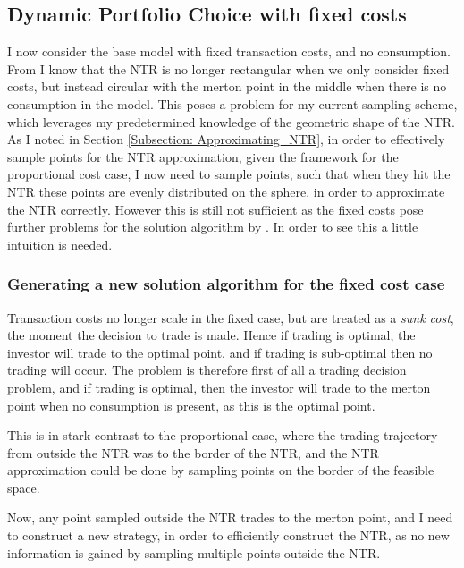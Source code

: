 \documentclass[11pt]{article}
\begin{document}
\subsection{Dynamic Portfolio Choice with fixed costs} \label{Subsection: Results_FixedCosts_No_Correlation}
I now consider the base model with fixed transaction costs, and no consumption.
From \autocite{Dybvig2020} I know that the \ac{NTR} is no longer rectangular when we only consider fixed costs, but instead circular
with the merton point in the middle when there is no consumption in the model.
This poses a problem for my current sampling scheme, which leverages my predetermined knowledge of the geometric shape of the \ac{NTR}.
As I noted in Section \ref{Subsection: Approximating_NTR}, in order to effectively sample points for the \ac{NTR} approximation, given the framework for the proportional cost case,
I now need to sample points, such that when they hit the \ac{NTR} these points are evenly distributed on the sphere, in order to approximate the \ac{NTR} correctly.
However this is still not sufficient as the fixed costs pose further problems for the solution algorithm by \autocite{Scheidegger2023}.
In order to see this a little intuition is needed.

\subsubsection{Generating a new solution algorithm for the fixed cost case} \label{Subsubsection: FixedCostSolution}
Transaction costs no longer scale in the fixed case, but are treated as a \textit{sunk cost}, the moment the decision to trade is made. Hence if trading is optimal, the investor will trade to the optimal point,
and if trading is sub-optimal then no trading will occur. The problem is therefore first of all a trading decision problem, and if trading is optimal, then the investor will trade to the merton point when no consumption is present, as this is the optimal point.

This is in stark contrast to the proportional case, where the trading trajectory from outside the \ac{NTR} was to the border of the \ac{NTR}, and the \ac{NTR} approximation could be done by sampling points on the border of the feasible space.

Now, any point sampled outside the \ac{NTR} trades to the merton point, and I need to construct a new strategy, 
in order to efficiently construct the \ac{NTR}, as no new information is
gained by sampling multiple points outside the \ac{NTR}.
\end{document}
